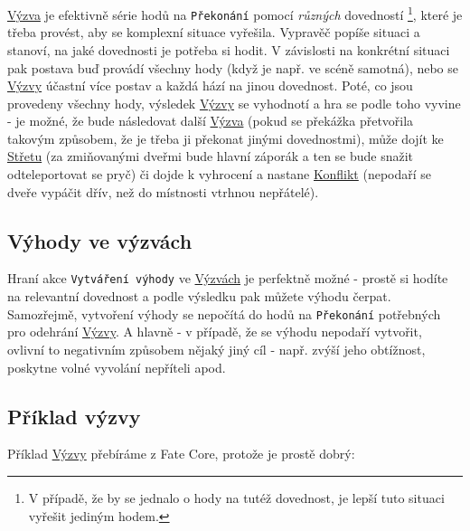 \documentclass[../main.tex]{subfiles}
\begin{document}
\underline{Výzva} je efektivně série hodů na \texttt{Překonání} pomocí \textit{různých} dovedností \footnote{V případě, že by se jednalo o hody na tutéž dovednost, je lepší tuto situaci vyřešit jediným hodem.}, které je třeba provést, aby se komplexní situace vyřešila. Vypravěč popíše situaci a stanoví, na jaké dovednosti je potřeba si hodit. V závislosti na konkrétní situaci pak postava buď provádí všechny hody (když je např. ve scéně samotná), nebo se \underline{Výzvy} účastní více postav a každá hází na jinou dovednost. Poté, co jsou provedeny všechny hody, výsledek \underline{Výzvy} se vyhodnotí a hra se podle toho vyvine - je možné, že bude následovat další \underline{Výzva} (pokud se překážka přetvořila takovým způsobem, že je třeba ji překonat jinými dovednostmi), může dojít ke \underline{Střetu} (za zmiňovanými dveřmi bude hlavní záporák a ten se bude snažit odteleportovat se pryč) či dojde k vyhrocení a nastane \underline{Konflikt} (nepodaří se dveře vypáčit dřív, než do místnosti vtrhnou nepřátelé).

\subsection{Výhody ve výzvách}
\label{sec:výhody-výzvy}

Hraní akce \texttt{Vytváření výhody} ve \underline{Výzvách} je perfektně možné - prostě si hodíte na relevantní dovednost a podle výsledku pak můžete výhodu čerpat. Samozřejmě, vytvoření výhody se nepočítá do hodů na \texttt{Překonání} potřebných pro odehrání \underline{Výzvy}. A hlavně - v případě, že se výhodu nepodaří vytvořit, ovlivní to negativním způsobem nějaký jiný cíl - např. zvýší jeho obtížnost, poskytne volné vyvolání nepříteli apod.

\subsection{Příklad výzvy}
\label{sec:příklad-výzvy}

Příklad \underline{Výzvy} přebíráme z Fate Core, protože je prostě dobrý:
\end{document}
